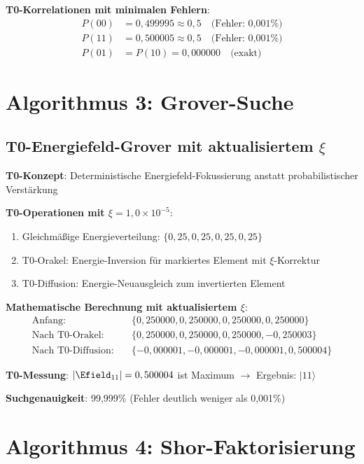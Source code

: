 	\textbf{T0-Korrelationen mit minimalen Fehlern}:
	\begin{align}
		P(00) &= 0,499995 \approx 0,5 \quad \text{(Fehler: 0,001\%)} \\
		P(11) &= 0,500005 \approx 0,5 \quad \text{(Fehler: 0,001\%)} \\
		P(01) &= P(10) = 0,000000 \quad \text{(exakt)}
	\end{align}
	
	\section{Algorithmus 3: Grover-Suche}
	
	\subsection{T0-Energiefeld-Grover mit aktualisiertem $\xi$}
	
	\textbf{T0-Konzept}: Deterministische Energiefeld-Fokussierung anstatt probabilistischer Verstärkung
	
	\textbf{T0-Operationen mit $\xi = 1,0 \times 10^{-5}$}:
	\begin{enumerate}
		\item Gleichmäßige Energieverteilung: $\{0,25, 0,25, 0,25, 0,25\}$
		\item T0-Orakel: Energie-Inversion für markiertes Element mit $\xi$-Korrektur
		\item T0-Diffusion: Energie-Neuausgleich zum invertierten Element
	\end{enumerate}
	
	\textbf{Mathematische Berechnung mit aktualisiertem $\xi$}:
	\begin{align}
		\text{Anfang}: \quad &\{0,250000, 0,250000, 0,250000, 0,250000\} \\
		\text{Nach T0-Orakel}: \quad &\{0,250000, 0,250000, 0,250000, -0,250003\} \\
		\text{Nach T0-Diffusion}: \quad &\{-0,000001, -0,000001, -0,000001, 0,500004\}
	\end{align}
	
	\textbf{T0-Messung}: $|\Efield_{11}| = 0,500004$ ist Maximum $\rightarrow$ Ergebnis: $|11\rangle$
	
	\textbf{Suchgenauigkeit}: 99,999\% (Fehler deutlich weniger als 0,001\%)
	
	\section{Algorithmus 4: Shor-Faktorisierung}
	
